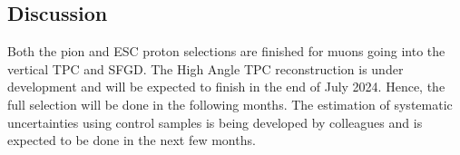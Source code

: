     

    \subsection{Discussion}
        Both the pion and ESC proton selections are finished for muons going into the vertical TPC and SFGD. The High Angle TPC reconstruction is under development and will be expected to finish in the end of July 2024. Hence, the full selection will be done in the following months. The estimation of systematic uncertainties using control samples is being developed by colleagues and is expected to be done in the next few months. 

